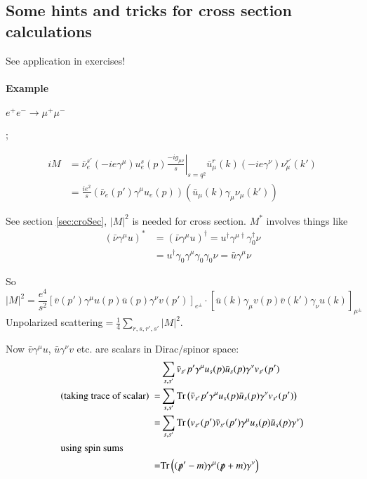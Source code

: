 \subsection{Some hints and tricks for cross section calculations} See application in exercises!
\paragraph{Example}
$e^+ e^- \rightarrow \mu^+ \mu^-$ \\
\begin{minipage}{0.4\textwidth}
	\begin{center}
	;
	\end{center}
\end{minipage}%
\begin{minipage}{0.6\textwidth}
	\begin{align*}
		iM &= \bar{\nu}_e^{s'}(-ie\gamma^\mu) u_e^s(p) \left. \frac{-ig_{\mu\nu}}{s}\right|_{s=q^2} \bar{u}^r_{\mu}(k) (-ie\gamma^\nu) \nu^{r'}_{\mu}(k') \\
		&= \frac{ie^2}{s} \left( \bar\nu_e(p')\gamma^\mu u_e(p) \right) \left( \bar{u}_\mu(k) \gamma_\mu \nu_\mu(k') \right)
	\end{align*}
\end{minipage}

See section \ref{sec:croSec}, $|M|^2$ is needed for cross section. $M^*$ involves things like 
\begin{align*}
	(\bar{\nu}\gamma^\mu u)^* &= (\bar{\nu} \gamma^\mu u)^\dagger = u^\dagger \gamma^{\mu\dagger}\gamma_0^\dagger \nu \\
							  &= u^\dagger \gamma_0 \gamma^\mu \gamma_0\gamma_0\nu = \bar{u} \gamma^\mu \nu
\end{align*}

So 
$$|M|^2 = \frac{e^4}{s^2} \left[ \bar{v}(p') \gamma^\mu u (p) \bar{u}(p)\gamma^\nu v(p') \right]_{e^\pm} \cdot  \left[ \bar{u}(k) \gamma_\mu v (p) \bar{v}(k')\gamma_\nu u(k) \right]_{\mu^\pm}$$
Unpolarized scattering$=\frac{1}{4} \sum_{r,s,r',s'}|M|^2$.

Now $\bar{v}\gamma^\mu u$, $\bar{u}\gamma^\nu v$ etc. are scalars in Dirac/spinor space:
\begin{align*}
	&\sum_{s,s'} \bar{v}_{s'}{p'} \gamma^\mu u_s(p) \bar{u}_s (p) \gamma^\nu v_{s'} (p') \\
	\text{(taking trace of scalar) }	=& \sum_{s,s'} \text{Tr} \left(\bar{v}_{s'}{p'} \gamma^\mu u_s(p) \bar{u}_s (p) \gamma^\nu v_{s'} (p') \right) \\
	=& \sum_{s,s'} \text{Tr} \left( v_{s'}(p')\bar{v}_{s'}(p') \gamma^\mu u_s(p) \bar{u}_s(p)\gamma^\nu \right) \\
	\shortintertext{using spin sums}
	=& \text{Tr} \left( (\slashed{p}' - m)\gamma^\mu (\slashed{p}+m)\gamma^\nu \right)
\end{align*}

